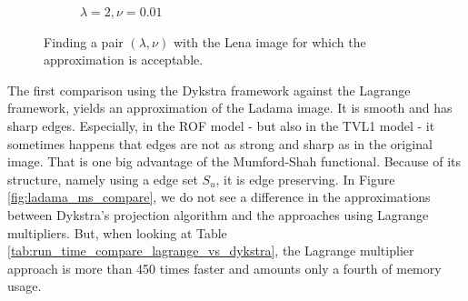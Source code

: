 \documentclass[abstracton]{scrreprt}
\begin{document}
\begin{figure}[!ht]
\begin{subfigure}[b]{0.24\textwidth}
                    \caption{$\lambda = 2, \nu = 0.01$}
                \end{subfigure}
                \caption[Parameter estimation for the convex relaxed Mumford-Shah functional.]{Finding a pair $(\lambda, \nu)$ with the Lena image for which the approximation is acceptable.}
            \label{fig:best_parameter_estimation_cr}
            \end{figure}
            The first comparison using the Dykstra framework against the Lagrange framework, yields an approximation of the Ladama image. It is smooth and has sharp edges. Especially, in the ROF model - but also in the TVL1 model - it sometimes happens that edges are not as strong and sharp as in the original image. That is one big advantage of the Mumford-Shah functional. Because of its structure, namely using a edge set $S_{u}$, it is edge preserving. In Figure \ref{fig:ladama_ms_compare}, we do not see a difference in the approximations between Dykstra's projection algorithm and the approaches using Lagrange multipliers. But, when looking at Table \ref{tab:run_time_compare_lagrange_vs_dykstra}, the Lagrange multiplier approach is more than 450 times faster and amounts only a fourth of memory usage.
\end{document}
